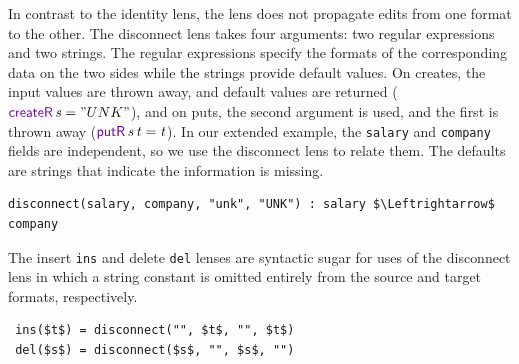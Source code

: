 \documentclass[acmsmall,screen,anonymous]{acmart}
\begin{document}
In contrast to the identity lens, the \Disconnect lens does not propagate edits
from one format to the other. The disconnect lens takes four arguments: two
regular expressions and two strings. The regular expressions specify the formats
of the corresponding data on the two sides while the strings provide default
values. On creates, the input values are thrown away, and default values are
returned ($\CreateROf{\String} =
\lstinline{"UNK"}$), and on puts, the second argument is used, and the first is
thrown away ($\PutROf{\String}{\StringAlt} = \StringAlt$). In our extended
example, the \lstinline{salary} and \lstinline{company} fields are independent,
so we use the disconnect lens to relate them.
The defaults are strings that indicate the information is missing.
%
\begin{lstlisting}
disconnect(salary, company, "unk", "UNK") : salary $\Leftrightarrow$ company
\end{lstlisting}
%
The insert \lstinline{ins} and delete \lstinline{del} lenses are
syntactic sugar for uses of the disconnect lens in which a string
constant is omitted entirely from the source and target formats,
respectively.
\begin{lstlisting}
 ins($t$) = disconnect("", $t$, "", $t$)
 del($s$) = disconnect($s$, "", $s$, "")
\end{lstlisting}
\end{document}
